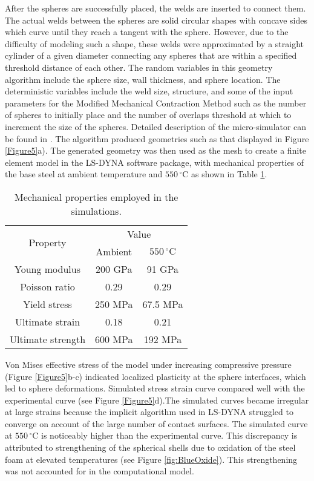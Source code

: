 \documentclass[review]{elsarticle}
\begin{document}
{After the spheres are successfully placed, the welds are inserted to connect them. The actual welds between the spheres are solid circular shapes with concave sides which curve until they reach a tangent with the sphere. However, due to the difficulty of modeling such a shape, these welds were approximated by a straight cylinder of a given diameter connecting any spheres that are within a specified threshold distance of each other. The random variables in this geometry algorithm include the sphere size, wall thickness, and sphere location. The deterministic variables include the weld size, structure, and some of the input parameters for the Modified Mechanical Contraction Method such as the number of spheres to initially place and the number of overlaps threshold at which to increment the size of the spheres. Detailed description of the micro-simulator can be found in \cite{Smith2012}. The algorithm produced geometries such as that displayed in Figure \ref{Figure5}a). The generated geometry was then used as the mesh to create a finite element model in the LS-DYNA software package, with mechanical properties of the base steel at ambient temperature and $550\,^{\circ}\mathrm{C}$ as shown in Table \ref{Tab2}.



\begin{table}[htbp]
	\centering
	\caption{Mechanical properties employed in the simulations.}
	\begin{tabular}{ccc}
		\toprule
		\multirow{2}[0]{*}{Property} & \multicolumn{2}{c}{Value} \\
		& Ambient & $550\,^{\circ}\mathrm{C}$ \\
		\midrule
		Young modulus & 200 GPa & 91 GPa \\
		Poisson ratio & 0.29  & 0.29 \\
		Yield stress & 250 MPa & 67.5 MPa \\
		Ultimate strain & 0.18  & 0.21 \\
		Ultimate strength & 600 MPa & 192 MPa \\
		\bottomrule
	\end{tabular}%
	\label{Tab2}%
\end{table}%

Von Mises effective stress of the model under increasing compressive pressure (Figure \ref{Figure5}b-c) indicated localized plasticity at the sphere interfaces, which led to sphere deformations. Simulated stress strain curve compared well with the experimental curve (see Figure \ref{Figure5}d).The simulated curves became irregular at large strains because the implicit algorithm used in LS-DYNA struggled to converge on account of the large number of contact surfaces. The simulated curve at $550\,^{\circ}\mathrm{C}$ is noticeably higher than the experimental curve. This discrepancy is attributed to strengthening of the spherical shells due to oxidation of the steel foam at elevated temperatures (see Figure \ref{fig:BlueOxide}). This strengthening was not accounted for in the computational model.


}
\end{document}
